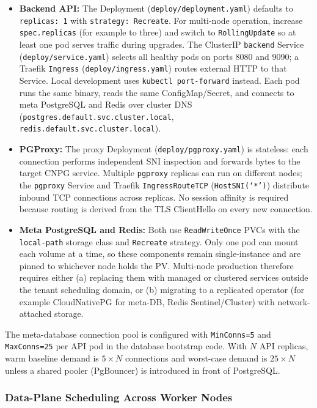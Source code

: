 \begin{itemize}
    \item \textbf{Backend API:} The Deployment (\texttt{deploy/deployment.yaml}) defaults to \texttt{replicas: 1} with \texttt{strategy: Recreate}. For multi-node operation, increase \texttt{spec.replicas} (for example to three) and switch to \texttt{RollingUpdate} so at least one pod serves traffic during upgrades. The ClusterIP \texttt{backend} Service (\texttt{deploy/service.yaml}) selects all healthy pods on ports 8080 and 9090; a Traefik \texttt{Ingress} (\texttt{deploy/ingress.yaml}) routes external HTTP to that Service. Local development uses \texttt{kubectl port-forward} instead. Each pod runs the same binary, reads the same ConfigMap/Secret, and connects to meta PostgreSQL and Redis over cluster DNS (\texttt{postgres.default.svc.cluster.local}, \texttt{redis.default.svc.cluster.local}).
    \item \textbf{PGProxy:} The proxy Deployment (\texttt{deploy/pgproxy.yaml}) is stateless: each connection performs independent SNI inspection and forwards bytes to the target CNPG service. Multiple \texttt{pgproxy} replicas can run on different nodes; the \texttt{pgproxy} Service and Traefik \texttt{IngressRouteTCP} (\texttt{HostSNI(`*')}) distribute inbound TCP connections across replicas. No session affinity is required because routing is derived from the TLS ClientHello on every new connection.
    \item \textbf{Meta PostgreSQL and Redis:} Both use \texttt{ReadWriteOnce} PVCs with the \texttt{local-path} storage class and \texttt{Recreate} strategy. Only one pod can mount each volume at a time, so these components remain single-instance and are pinned to whichever node holds the PV. Multi-node production therefore requires either (a) replacing them with managed or clustered services outside the tenant scheduling domain, or (b) migrating to a replicated operator (for example CloudNativePG for meta-DB, Redis Sentinel/Cluster) with network-attached storage.
\end{itemize}

The meta-database connection pool is configured with \texttt{MinConns=5} and \texttt{MaxConns=25} per API pod in the database bootstrap code. With $N$ API replicas, warm baseline demand is $5 \times N$ connections and worst-case demand is $25 \times N$ unless a shared pooler (PgBouncer) is introduced in front of PostgreSQL.

\subsubsection{Data-Plane Scheduling Across Worker Nodes}

